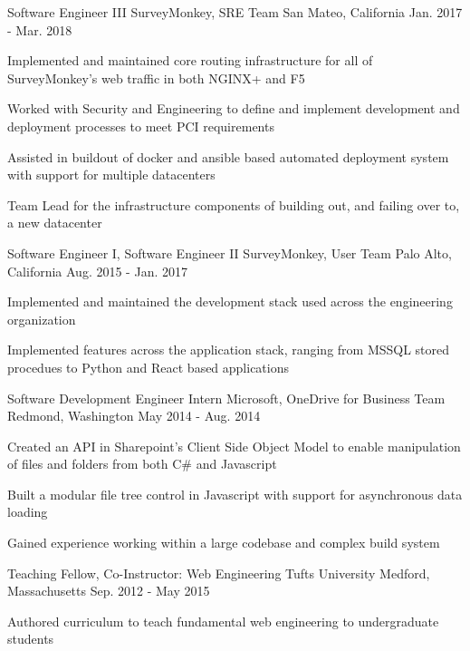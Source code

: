 \begin{cventries}
{\begin{cvitems}
      \end{cvitems}
    }
  \cventry
    {Software Engineer III}
    {SurveyMonkey, SRE Team}
    {San Mateo, California}
    {Jan. 2017 - Mar. 2018}
    {
      \begin{cvitems}
        \item {Implemented and maintained core routing infrastructure for all of SurveyMonkey's web traffic in both NGINX+ and F5}
        \item {Worked with Security and Engineering to define and implement development and deployment processes to meet PCI requirements}
        \item {Assisted in buildout of docker and ansible based automated deployment system with support for multiple datacenters}
        \item {Team Lead for the infrastructure components of building out, and failing over to, a new datacenter}
      \end{cvitems}
    }
  \cventry
    {Software Engineer I, Software Engineer II}
    {SurveyMonkey, User Team}
    {Palo Alto, California}
    {Aug. 2015 - Jan. 2017}
    {
      \begin{cvitems}
        \item {Implemented and maintained the development stack used across the engineering organization}
        \item {Implemented features across the application stack, ranging from MSSQL stored procedues to Python and React based applications}
      \end{cvitems}
    }
  \cventry
    {Software Development Engineer Intern}
    {Microsoft, OneDrive for Business Team}
    {Redmond, Washington}
    {May 2014 - Aug. 2014}
    {
      \begin{cvitems}
        \item {Created an API in Sharepoint's Client Side Object Model to enable manipulation of files and folders from both C\# and Javascript}
        \item {Built a modular file tree control in Javascript with support for asynchronous data loading}
        \item {Gained experience working within a large codebase and complex build system}
      \end{cvitems}
    }
  \cventry
    {Teaching Fellow, Co-Instructor: Web Engineering}
    {Tufts University}
    {Medford, Massachusetts}
    {Sep. 2012 - May 2015}
    {
      \begin{cvitems}
        \item {Authored curriculum to teach fundamental web engineering to undergraduate students}

\end{cvitems}}
\end{cventries}
